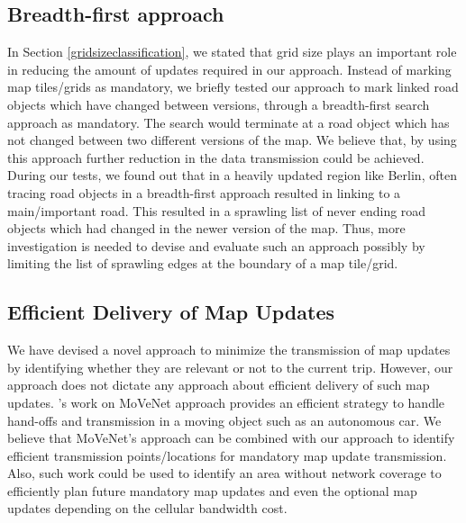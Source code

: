 \subsection{Breadth-first approach}
In Section \ref{gridsizeclassification}, we stated that grid size plays an important role in reducing the amount of updates required in our approach. Instead of marking map tiles/grids as mandatory, we briefly tested our approach to mark linked road objects which have changed between versions, through a breadth-first search approach as mandatory. The search would terminate at a road object which has not changed between two different versions of the map. We believe that, by using this approach further reduction in the data transmission could be achieved. During our tests, we found out that in a heavily updated region like Berlin, often tracing road objects in a breadth-first approach resulted in linking to a main/important road. This resulted in a sprawling list of never ending road objects which had changed in the newer version of the map. Thus, more investigation is needed to devise and evaluate such an approach possibly by limiting the list of sprawling edges at the boundary of a map tile/grid.
\subsection{Efficient Delivery of Map Updates}
We have devised a novel approach to minimize the transmission of map updates by identifying whether they are relevant or not to the current trip. However, our approach does not dictate any approach about efficient delivery of such map updates. \citet{movenet}'s work on MoVeNet approach provides an efficient strategy to handle hand-offs and transmission in a moving object such as an autonomous car. We believe that MoVeNet's approach can be combined with our approach to identify efficient transmission points/locations for mandatory map update transmission. Also, such work could be used to identify an area without network coverage to efficiently plan future mandatory map updates and even the optional map updates depending on the cellular bandwidth cost.



